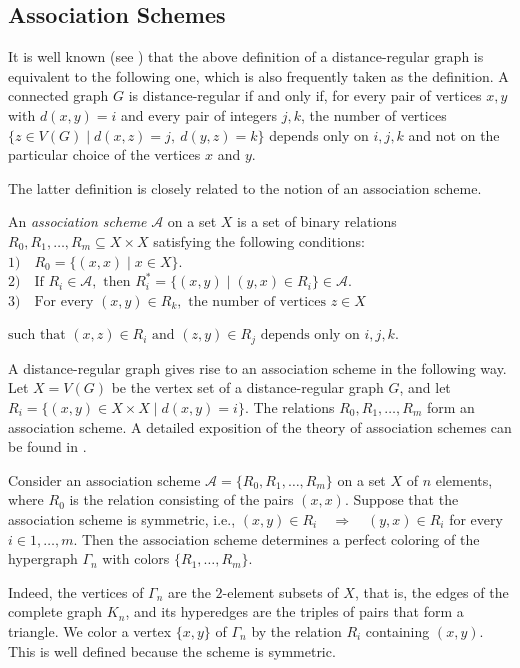 \documentclass[11pt]{article}
\theoremstyle{definition}
\begin{document}
{{{\subsection{Association Schemes}




It is well known (see \cite{CRC}) that the above definition of a distance-regular graph is equivalent to the following one, which is also frequently taken as the definition. A connected graph $G$ is distance-regular if and only if, for every pair of vertices $x,y$ with $d(x,y)=i$ and every pair of integers $j,k$, the number of vertices
$\{z\in V(G)\mid d(x,z)=j,\ d(y,z)=k\}$
depends only on $i,j,k$ and not on the particular choice of the vertices $x$ and $y$.

The latter definition is closely related to the notion of an association scheme.

An {\sl association scheme} $\mathcal{A}$ on a set $X$ is a set of binary relations
$R_0,R_1,\dots,R_m\subseteq X\times X$
satisfying the following conditions:\\
$
1)\quad R_0=\{(x,x)\mid x\in X\}.$\\
$2)\quad \text{If }R_i\in\mathcal{A},\text{ then }
R_i^*=\{(x,y)\mid (y,x)\in R_i\}\in\mathcal{A}$.\\
$3)\quad \text{For every }(x,y)\in R_k,\text{ the number of vertices }z\in X$

$\text{such that }(x,z)\in R_i\text{ and }(z,y)\in R_j
\text{ depends only on }i,j,k.$


A distance-regular graph gives rise to an association scheme in the following way. Let $X=V(G)$ be the vertex set of a distance-regular graph $G$, and let
$R_i=\{(x,y)\in X\times X\mid d(x,y)=i\}$.
The relations $R_0,R_1,\dots,R_m$ form an association scheme. A detailed exposition of the theory of association schemes can be found in \cite{BIto}.

Consider an association scheme
$\mathcal{A}=\{R_0,R_1,\dots,R_m\}$
on a set $X$ of $n$ elements, where $R_0$ is the relation consisting of the pairs $(x,x)$. Suppose that the association scheme is symmetric, i.e.,
$(x,y)\in R_i\quad\Longrightarrow\quad (y,x)\in R_i $
for every $i\in{1,\dots,m}$. Then the association scheme determines a perfect coloring of the hypergraph $\Gamma_n$ with colors
$\{R_1,\dots,R_m\}$.

Indeed, the vertices of $\Gamma_n$ are the $2$-element subsets of $X$, that is, the edges of the complete graph $K_n$, and its hyperedges are the triples of pairs that form a triangle. We color a vertex $\{x,y\}$ of $\Gamma_n$ by the relation $R_i$ containing $(x,y)$. This is well defined because the scheme is symmetric.

}}}
\end{document}
